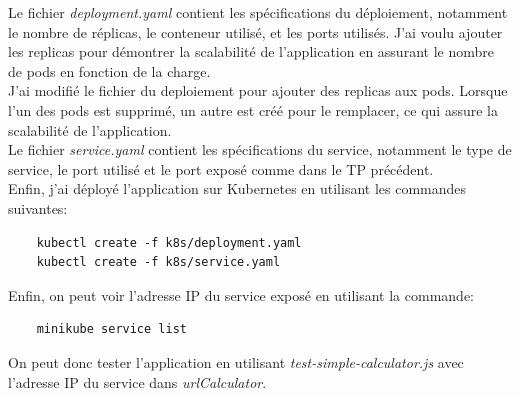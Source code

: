\documentclass{article}
\begin{document}
Le fichier \textit{deployment.yaml} contient les spécifications du déploiement, notamment le nombre de réplicas, le conteneur utilisé, et les ports utilisés. J'ai voulu ajouter les replicas pour démontrer la scalabilité de l'application en assurant le nombre de pods en fonction de la charge. \\
J'ai modifié le fichier du deploiement pour ajouter des replicas aux pods. Lorsque l'un des pods est supprimé, un autre est créé pour le remplacer, ce qui assure la scalabilité de l'application. \\

Le fichier \textit{service.yaml} contient les spécifications du service, notamment le type de service, le port utilisé et le port exposé comme dans le TP précédent. \\

Enfin, j'ai déployé l'application sur Kubernetes en utilisant les commandes suivantes:

\begin{verbatim}
    kubectl create -f k8s/deployment.yaml
    kubectl create -f k8s/service.yaml
\end{verbatim}

Enfin, on peut voir l'adresse IP du service exposé en utilisant la commande:
\begin{verbatim}
    minikube service list
\end{verbatim}

On peut donc tester l'application en utilisant \textit{test-simple-calculator.js} avec l'adresse IP du service dans \textit{urlCalculator}.
\end{document}
